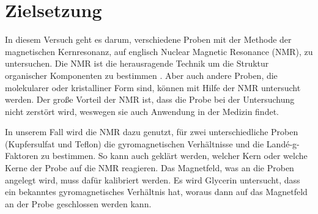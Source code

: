 \section{Zielsetzung}
In diesem Versuch geht es darum, verschiedene Proben mit der Methode der magnetischen Kernresonanz, auf englisch Nuclear Magnetic Resonance (NMR), zu untersuchen. Die NMR ist die herausragende Technik um die Struktur organischer Komponenten zu bestimmen \cite{anleitung}. Aber auch andere Proben, die molekularer oder kristalliner Form sind, können mit Hilfe der NMR untersucht werden. Der große Vorteil der NMR ist, dass die Probe bei der Untersuchung nicht zerstört wird, weswegen sie auch Anwendung in der Medizin findet.

In unserem Fall wird die NMR dazu genutzt, für zwei unterschiedliche Proben (Kupfersulfat und Teflon) die gyromagnetischen Verhältnisse und die Landé-g-Faktoren zu bestimmen. So kann auch geklärt werden, welcher Kern oder welche Kerne der Probe auf die NMR reagieren. Das Magnetfeld, was an die Proben angelegt wird, muss dafür kalibriert werden. Es wird Glycerin untersucht, dass ein bekanntes gyromagnetisches Verhältnis hat, woraus dann auf das Magnetfeld an der Probe geschlossen werden kann.
